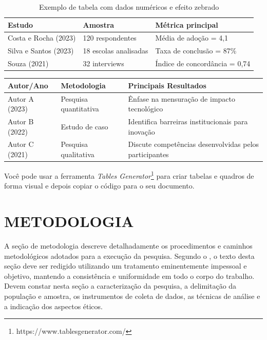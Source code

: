 \begin{table}[htbp]
    \centering
    \caption{Exemplo de tabela com dados numéricos e efeito zebrado}
    \label{tab:estudos_zebrada}
    \begin{tabularx}{0.8\textwidth}{p{4cm}XX}
        \toprule
        \textbf{Estudo} & \textbf{Amostra} & \textbf{Métrica principal} \\
        \midrule
        Costa e Rocha (2023) & 120 respondentes & Média de adoção = 4,1 \\
        Silva e Santos (2023) & 18 escolas analisadas & Taxa de conclusão = 87\% \\
        Souza (2021) & 32 interviews & Índice de concordância = 0,74 \\
        \bottomrule
    \end{tabularx}
\end{table}

\begin{quadro}[htbp]
    \centering
    \caption{Exemplo de quadro com conteúdo qualitativo e efeito zebrado}
    \label{qua:estudos_zebrado}
    \begin{tabularx}{\textwidth}{|p{3cm}|p{4cm}|X|}
        \hline
        \textbf{Autor/Ano} & \textbf{Metodologia} & \textbf{Principais Resultados} \\
        \hline
        Autor A (2023) & Pesquisa quantitativa & Ênfase na mensuração de impacto tecnológico \\ \hline
        Autor B (2022) & Estudo de caso & Identifica barreiras institucionais para inovação \\ \hline
        Autor C (2021) & Pesquisa qualitativa & Discute competências desenvolvidas pelos participantes \\ \hline
    \end{tabularx}
\end{quadro}

Você pode usar a ferramenta \textit{Tables Generator}\footnote{https://www.tablesgenerator.com/} para criar tabelas e quadros de forma visual e depois copiar o código para o seu documento.

\section{METODOLOGIA}
\label{sec:metodologia}

A seção de metodologia descreve detalhadamente os procedimentos e caminhos metodológicos adotados para a execução da pesquisa. Segundo o , o texto desta seção deve ser redigido utilizando um tratamento eminentemente impessoal e objetivo, mantendo a consistência e uniformidade em todo o corpo do trabalho. Devem constar nesta seção a caracterização da pesquisa, a delimitação da população e amostra, os instrumentos de coleta de dados, as técnicas de análise e a indicação dos aspectos éticos.

